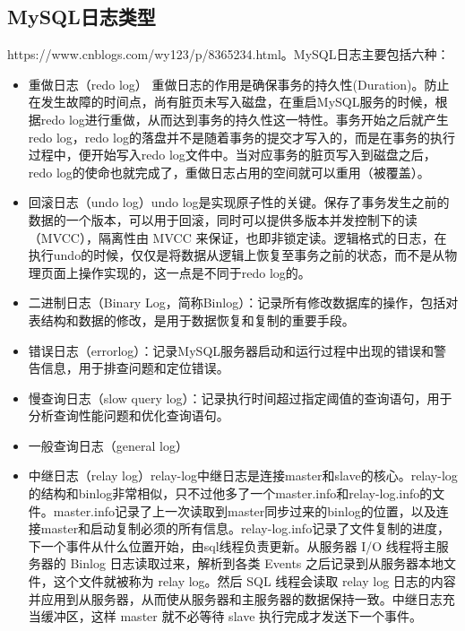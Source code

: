 \documentclass[../../../interview-questions.tex]{subfiles}
\begin{document}
\subsection{MySQL日志类型}

https://www.cnblogs.com/wy123/p/8365234.html。MySQL日志主要包括六种：

\begin{itemize}
    \item {重做日志（redo log）} 重做日志的作用是确保事务的持久性(Duration)。防止在发生故障的时间点，尚有脏页未写入磁盘，在重启MySQL服务的时候，根据redo log进行重做，从而达到事务的持久性这一特性。事务开始之后就产生redo log，redo log的落盘并不是随着事务的提交才写入的，而是在事务的执行过程中，便开始写入redo log文件中。当对应事务的脏页写入到磁盘之后，redo log的使命也就完成了，重做日志占用的空间就可以重用（被覆盖）。
    \item {回滚日志（undo log）}undo log是实现原子性的关键。保存了事务发生之前的数据的一个版本，可以用于回滚，同时可以提供多版本并发控制下的读（MVCC），隔离性由 MVCC 来保证，也即非锁定读。逻辑格式的日志，在执行undo的时候，仅仅是将数据从逻辑上恢复至事务之前的状态，而不是从物理页面上操作实现的，这一点是不同于redo log的。
    \item {二进制日志（Binary Log，简称Binlog）}：记录所有修改数据库的操作，包括对表结构和数据的修改，是用于数据恢复和复制的重要手段。
    \item {错误日志（errorlog）}：记录MySQL服务器启动和运行过程中出现的错误和警告信息，用于排查问题和定位错误。
    \item {慢查询日志（slow query log）}：记录执行时间超过指定阈值的查询语句，用于分析查询性能问题和优化查询语句。
    \item {一般查询日志（general log）}
    \item {中继日志（relay log）}relay-log中继日志是连接master和slave的核心。relay-log的结构和binlog非常相似，只不过他多了一个master.info和relay-log.info的文件。master.info记录了上一次读取到master同步过来的binlog的位置，以及连接master和启动复制必须的所有信息。relay-log.info记录了文件复制的进度，下一个事件从什么位置开始，由sql线程负责更新。从服务器 I/O 线程将主服务器的 Binlog 日志读取过来，解析到各类 Events 之后记录到从服务器本地文件，这个文件就被称为 relay log。然后 SQL 线程会读取 relay log 日志的内容并应用到从服务器，从而使从服务器和主服务器的数据保持一致。中继日志充当缓冲区，这样 master 就不必等待 slave 执行完成才发送下一个事件。
\end{itemize}
\end{document}
